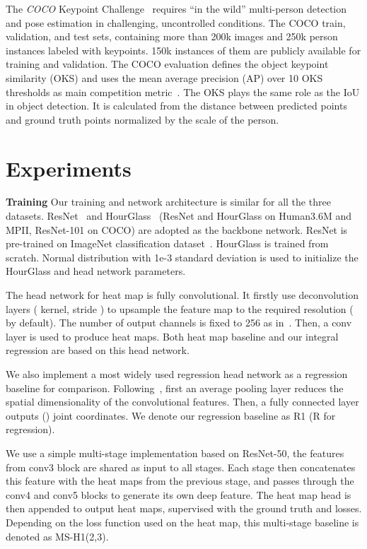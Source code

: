 \documentclass[runningheads]{llncs}
\begin{document}
The \emph{COCO} Keypoint Challenge~\cite{lin2014microsoft} requires ``in the wild'' multi-person detection and pose estimation in challenging, uncontrolled conditions. The COCO train, validation, and test sets, containing more than 200k images and 250k person instances labeled with keypoints. 150k instances of them are publicly available for training and validation. The COCO evaluation defines the object keypoint similarity (OKS) and uses the mean average precision (AP) over 10 OKS thresholds as main competition metric~\cite{cocoleaderboard}. The OKS plays the same role as the IoU in object detection. It is calculated from the distance between predicted points and ground truth points normalized by the scale of the person.

\section{Experiments}
\label{sec.exp}

\textbf{Training} Our training and network architecture is similar for all the three datasets. 
ResNet~\cite{he2016deep} and HourGlass~\cite{newell2016stacked} (ResNet and HourGlass on Human3.6M and MPII, ResNet-101 on COCO) are adopted as the backbone network. ResNet is pre-trained on ImageNet classification dataset~\cite{deng2009imagenet}. HourGlass is trained from scratch. Normal distribution with 1e-3 standard deviation is used to initialize the HourGlass and head network parameters. 

The head network for heat map is fully convolutional. It firstly use deconvolution layers ( kernel, stride ) to upsample the feature map to the required resolution ( by default). The number of output channels is fixed to 256 as in~\cite{he2017mask}. Then, a  conv layer is used to produce  heat maps. Both heat map baseline and our integral regression are based on this head network. 

We also implement a most widely used regression head network as a regression baseline for comparison. Following~\cite{carreira2016human,sun2017compositional,zhou2017towards,zhou2016deep}, first an average pooling layer reduces the spatial dimensionality of the convolutional features. Then, a fully connected layer outputs () joint coordinates. We denote our regression baseline as R1 (R for regression).

We use a simple multi-stage implementation based on ResNet-50, the features from conv3 block are shared as input to all stages. Each stage then concatenates this feature with the heat maps from the previous stage, and passes through the conv4 and conv5 blocks to generate its own deep feature. The heat map head is then appended to output heat maps, supervised with the ground truth and losses. Depending on the loss function used on the heat map, this multi-stage baseline is denoted as MS-H1(2,3).
\end{document}

